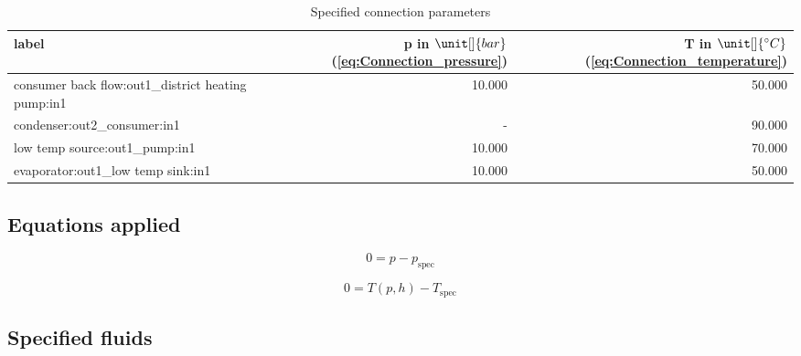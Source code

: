 \begin{table}[H]\begin{center}
\begin{tabular}{lrr}
\toprule
                                              label &  p in $\unit[]{bar}$ (\ref{eq:Connection_pressure}) &  T in $\unit[]{^\circ C}$ (\ref{eq:Connection_temperature}) \\
\midrule
 consumer back flow:out1\_district heating pump:in1 &                                              10.000 &                                                      50.000 \\
                       condenser:out2\_consumer:in1 &                                                   - &                                                      90.000 \\
                     low temp source:out1\_pump:in1 &                                              10.000 &                                                      70.000 \\
                 evaporator:out1\_low temp sink:in1 &                                              10.000 &                                                      50.000 \\
\bottomrule
\end{tabular}
\caption{Specified connection parameters}
\end{center}\end{table}

\subsection{Equations applied}

\begin{equation}
\label{eq:Connection_pressure}
0 = p - p_\mathrm{spec}
\end{equation}

\begin{equation}
\label{eq:Connection_temperature}
0 = T \left(p, h \right) - T_\mathrm{spec}
\end{equation}

\subsection{Specified fluids}

